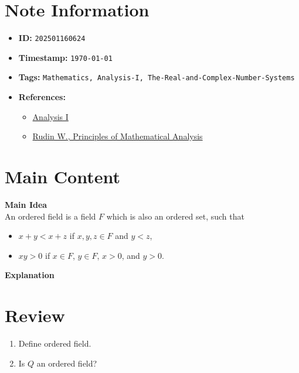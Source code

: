 \clearpage
{}
\label{202501160624}
\renewcommand{\notetitle}{Definition of Ordered Field}

\section*{Note Information}
\begin{itemize}
  \item \textbf{ID:} \texttt{202501160624}
  \item \textbf{Timestamp:} \texttt{\today \ \currenttime}
  \item \textbf{Tags:} \texttt{Mathematics, Analysis-I, The-Real-and-Complex-Number-Systems}
  \item \textbf{References:}
    \begin{itemize}
      \item \href{https://ocw.mit.edu/courses/18-100b-analysis-i-fall-2010/}{Analysis I}
      \item \href{/home/garrett/Personal/References/Mathematics/Analysis-I/Rudin.pdf}{Rudin W., Principles of Mathematical Analysis}
    \end{itemize}
\end{itemize}


\section*{Main Content}
\textbf{Main Idea}\\
An ordered field is a field $F$ which is also an ordered set, such that
\begin{itemize}
  \item $x + y < x + z$ if $x,y,z \in F$ and $y < z$,
  \item $xy > 0$ if $x \in F$, $y \in F$, $x > 0$, and $y > 0$.
\end{itemize}

\textbf{Explanation}\\


\section*{Review}
\begin{enumerate}
  \item Define ordered field.
  \item Is $Q$ an ordered field?
\end{enumerate}


